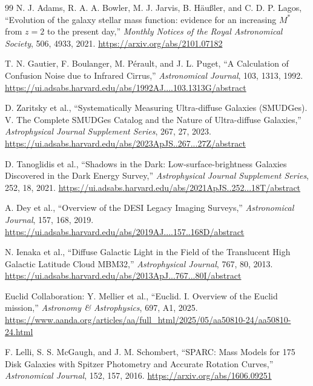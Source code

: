 \begin{thebibliography}{99}
N. J. Adams, R. A. A. Bowler, M. J. Jarvis, B. H\"au{\ss}ler, and C. D. P. Lagos,
``Evolution of the galaxy stellar mass function: evidence for an increasing $M^{*}$ from $z=2$ to the present day,''
\emph{Monthly Notices of the Royal Astronomical Society}, 506, 4933, 2021.
\url{https://arxiv.org/abs/2101.07182}

T. N. Gautier, F. Boulanger, M. P\'erault, and J. L. Puget,
``A Calculation of Confusion Noise due to Infrared Cirrus,''
\emph{Astronomical Journal}, 103, 1313, 1992.
\url{https://ui.adsabs.harvard.edu/abs/1992AJ....103.1313G/abstract}

D. Zaritsky et al.,
``Systematically Measuring Ultra-diffuse Galaxies (SMUDGes). V. The Complete SMUDGes Catalog and the Nature of Ultra-diffuse Galaxies,''
\emph{Astrophysical Journal Supplement Series}, 267, 27, 2023.
\url{https://ui.adsabs.harvard.edu/abs/2023ApJS..267...27Z/abstract}

D. Tanoglidis et al.,
``Shadows in the Dark: Low-surface-brightness Galaxies Discovered in the Dark Energy Survey,''
\emph{Astrophysical Journal Supplement Series}, 252, 18, 2021.
\url{https://ui.adsabs.harvard.edu/abs/2021ApJS..252...18T/abstract}

A. Dey et al.,
``Overview of the DESI Legacy Imaging Surveys,''
\emph{Astronomical Journal}, 157, 168, 2019.
\url{https://ui.adsabs.harvard.edu/abs/2019AJ....157..168D/abstract}

N. Ienaka et al.,
``Diffuse Galactic Light in the Field of the Translucent High Galactic Latitude Cloud MBM32,''
\emph{Astrophysical Journal}, 767, 80, 2013.
\url{https://ui.adsabs.harvard.edu/abs/2013ApJ...767...80I/abstract}

Euclid Collaboration: Y. Mellier et al.,
``Euclid. I. Overview of the Euclid mission,''
\emph{Astronomy \& Astrophysics}, 697, A1, 2025.
\url{https://www.aanda.org/articles/aa/full_html/2025/05/aa50810-24/aa50810-24.html}

F. Lelli, S. S. McGaugh, and J. M. Schombert,
``SPARC: Mass Models for 175 Disk Galaxies with Spitzer Photometry and Accurate Rotation Curves,''
\emph{Astronomical Journal}, 152, 157, 2016.
\url{https://arxiv.org/abs/1606.09251}


\end{thebibliography}
